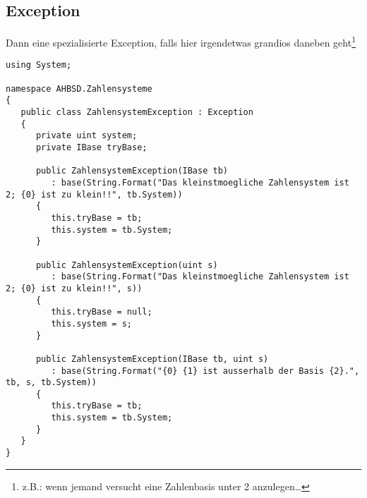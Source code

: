\subsection{Exception}
Dann eine spezialisierte Exception, falls hier irgendetwas grandios daneben geht\footnote{z.B.: wenn jemand versucht eine Zahlenbasis unter 2 anzulegen\dots}
\label{listing:C_sharp:Exception}
\begin{lstlisting}
using System;

namespace AHBSD.Zahlensysteme
{
   public class ZahlensystemException : Exception
   {
      private uint system;
      private IBase tryBase;
      
      public ZahlensystemException(IBase tb)
         : base(String.Format("Das kleinstmoegliche Zahlensystem ist 2; {0} ist zu klein!!", tb.System))
      {
         this.tryBase = tb;
         this.system = tb.System;
      }
      
      public ZahlensystemException(uint s)
         : base(String.Format("Das kleinstmoegliche Zahlensystem ist 2; {0} ist zu klein!!", s))
      {
         this.tryBase = null;
         this.system = s;
      }
      
      public ZahlensystemException(IBase tb, uint s)
         : base(String.Format("{0} {1} ist ausserhalb der Basis {2}.", tb, s, tb.System))
      {
         this.tryBase = tb;
         this.system = tb.System;
      }  
   }
}	
\end{lstlisting}

